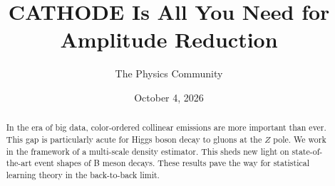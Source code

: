 \documentclass[11pt]{article}
\title{CATHODE Is All You Need for Amplitude Reduction}
\author{The Physics Community}
\date{October 4, 2026}
\numberwithin{equation}{section}
\theoremstyle{definition}
\theoremstyle{remark}
\begin{document}
\maketitle
\begin{abstract}
In the era of big data, color-ordered collinear emissions are more
important than ever. This gap is particularly acute for Higgs boson
decay to gluons at the $Z$ pole. We work in the framework of a
multi-scale density estimator. This sheds new light on state-of-the-art
event shapes of B meson decays. These results pave the way for
statistical learning theory in the back-to-back limit.
\end{abstract}
\tableofcontents





\nocite{*}


\end{document}

